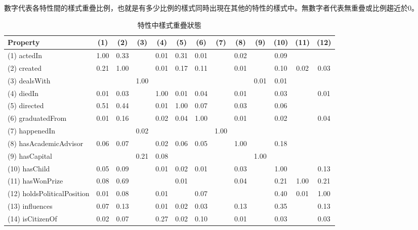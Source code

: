 \begin{table}[t]
        \caption{特性中樣式重疊狀態}
        \label{t:yago-overlap}
        \centering
        數字代表各特性間的樣式重疊比例，也就是有多少比例的樣式同時出現在其他的特性的樣式中。無數字者代表無重疊或比例趨近於0。
    \begin{center}
        \scriptsize
        \begin{tabular}{|l||*{12}{c}|}
            \hline
       Property & (1) & (2) & (3) & (4) & (5) & (6) & (7) & (8) & (9) & (10) & (11) & (12) \\
            \hline
            (1) actedIn  & 1.00  & 0.33  &    & 0.01  & 0.31  & 0.01  &    & 0.02  &    & 0.09  &    &   \\
            (2) created  & 0.21  & 1.00  &    & 0.01  & 0.17  & 0.11  &    & 0.01  &    & 0.10  & 0.02  & 0.03 \\
            (3) dealsWith  &    &    & 1.00  &    &    &    &    &    & 0.01  & 0.01  &    &   \\
            (4) diedIn  & 0.01  & 0.03  &    & 1.00  & 0.01  & 0.04  &    & 0.01  &    & 0.03  &    & 0.01 \\
            (5) directed  & 0.51  & 0.44  &    & 0.01  & 1.00  & 0.07  &    & 0.03  &    & 0.06  &    &   \\
            (6) graduatedFrom  & 0.01  & 0.16  &    & 0.02  & 0.04  & 1.00  &    & 0.01  &    & 0.02  &    & 0.04 \\
            (7) happenedIn  &    &    & 0.02  &    &    &    & 1.00  &    &    &    &    &   \\
            (8) hasAcademicAdvisor  & 0.06  & 0.07  &    & 0.02  & 0.06  & 0.05  &    & 1.00  &    & 0.18  &    &   \\
            (9) hasCapital  &    &    & 0.21  & 0.08  &    &    &    &    & 1.00  &    &    &   \\
            (10) hasChild  & 0.05  & 0.09  &    & 0.01  & 0.02  & 0.01  &    & 0.03  &    & 1.00  &    & 0.13 \\
            (11) hasWonPrize  & 0.08  & 0.69  &    &    & 0.01  &    &    & 0.04  &    & 0.21  & 1.00  & 0.21 \\
            (12) holdsPoliticalPosition  & 0.01  & 0.08  &    & 0.01  &    & 0.07  &    &    &    & 0.40  & 0.01  & 1.00 \\
            (13) influences  & 0.07  & 0.13  &    & 0.01  & 0.02  & 0.03  &    & 0.13  &    & 0.35  &    & 0.13 \\
            (14) isCitizenOf  & 0.02  & 0.07  &    & 0.27  & 0.02  & 0.10  &    & 0.01  &    & 0.03  &    & 0.03 \\

\end{tabular}
\end{center}
\end{table}
